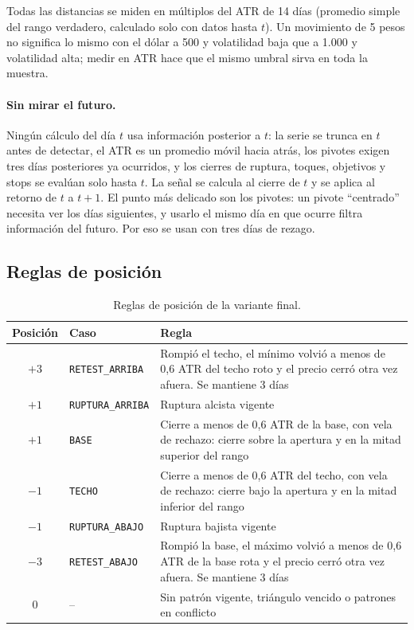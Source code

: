 \documentclass[10pt,a4paper]{article}
\begin{document}
Todas las distancias se miden en múltiplos del ATR de 14 días (promedio simple del
rango verdadero, calculado solo con datos hasta $t$). Un movimiento de 5 pesos no
significa lo mismo con el dólar a 500 y volatilidad baja que a 1.000 y volatilidad
alta; medir en ATR hace que el mismo umbral sirva en toda la muestra.

\paragraph{Sin mirar el futuro.} Ningún cálculo del día $t$ usa información
posterior a $t$: la serie se trunca en $t$ antes de detectar, el ATR es un
promedio móvil hacia atrás, los pivotes exigen tres días posteriores ya ocurridos,
y los cierres de ruptura, toques, objetivos y stops se evalúan solo hasta $t$. La
señal se calcula al cierre de $t$ y se aplica al retorno de $t$ a $t+1$. El punto
más delicado son los pivotes: un pivote ``centrado'' necesita ver los días
siguientes, y usarlo el mismo día en que ocurre filtra información del futuro. Por
eso se usan con tres días de rezago.

\subsection{Reglas de posición}

\begin{table}[htbp]\centering\small
\begin{tabularx}{\textwidth}{@{}clX@{}}
\toprule
Posición & Caso & Regla \\
\midrule
$+3$ & \texttt{RETEST\_ARRIBA} & Rompió el techo, el mínimo volvió a menos de 0,6 ATR del techo roto y el precio cerró otra vez afuera. Se mantiene 3 días \\
$+1$ & \texttt{RUPTURA\_ARRIBA} & Ruptura alcista vigente \\
$+1$ & \texttt{BASE} & Cierre a menos de 0,6 ATR de la base, con vela de rechazo: cierre sobre la apertura y en la mitad superior del rango \\
$-1$ & \texttt{TECHO} & Cierre a menos de 0,6 ATR del techo, con vela de rechazo: cierre bajo la apertura y en la mitad inferior del rango \\
$-1$ & \texttt{RUPTURA\_ABAJO} & Ruptura bajista vigente \\
$-3$ & \texttt{RETEST\_ABAJO} & Rompió la base, el máximo volvió a menos de 0,6 ATR de la base rota y el precio cerró otra vez afuera. Se mantiene 3 días \\
$0$  & -- & Sin patrón vigente, triángulo vencido o patrones en conflicto \\
\bottomrule
\end{tabularx}
\caption{Reglas de posición de la variante final.}\label{tab:reglas}
\end{table}
\end{document}
